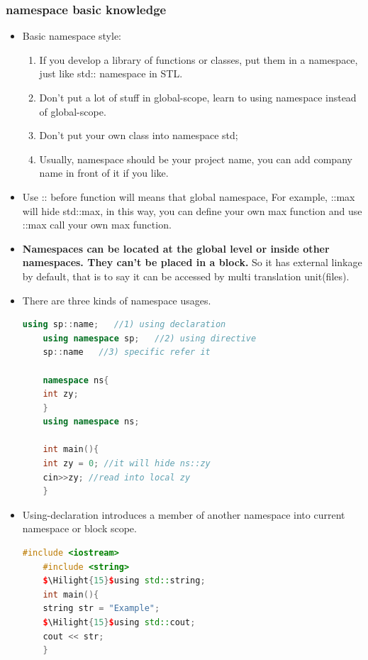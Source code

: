 \documentclass[a4paper,12pt,twoside]{book}
\newcommand{\Hilight}[1]{\makebox[0pt][l]{\color{yellow}\rule[-3pt]{#1em}{11pt}}}
\begin{document}
\subsubsection{namespace basic knowledge}
\begin{itemize}
	
	\item Basic namespace style:
	\begin{enumerate}
		\item If you develop a library of functions or classes, put them in a namespace, just like std:: namespace in STL.
		
		\item Don't put a lot of stuff in global-scope, learn to using namespace instead of global-scope.
		
		\item Don't put your own class into namespace std;
		
		\item Usually, namespace should be your project name, you can add company name in front of it if you like.
	\end{enumerate}
	
	
	\item Use :: before function will means that global namespace, For example, ::max will hide std::max, in this way, you can define your own max function and use ::max call your own max function. 
	
	\item \textbf{Namespaces can be located at the global level or inside other namespaces. They can't be placed in a block.} So it has external linkage by default, that is to say it can be accessed by multi translation unit(files).
	
	
	\item There are three kinds of namespace usages.
	\begin{lstlisting}[frame=single, language=c++]
	using sp::name;   //1) using declaration
	using namespace sp;   //2) using directive
	sp::name   //3) specific refer it
	
	namespace ns{
	int zy;
	}
	using namespace ns;
	
	int main(){
	int zy = 0; //it will hide ns::zy
	cin>>zy; //read into local zy
	}
	\end{lstlisting}
	
	\item Using-declaration introduces a member of another namespace into current namespace or block scope.
	
	\begin{lstlisting}[frame=single, language=c++, mathescape=true]
	#include <iostream>
	#include <string>
	$\Hilight{15}$using std::string;
	int main(){
	string str = "Example";
	$\Hilight{15}$using std::cout;
	cout << str;
	}
	\end{lstlisting}
	

\end{itemize}
\end{document}
